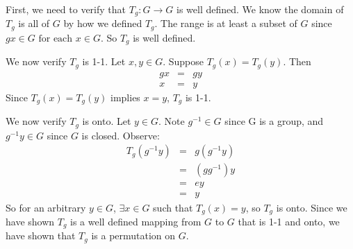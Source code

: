 \documentclass{article}
\begin{document}
First, we need to verify that $T_g \colon G \to G$ is well defined. We know the domain of $T_g$ is all of $G$ by how we defined $T_g$. The range is at least a subset of $G$ since $gx \in G \mbox{ for each }x \in G$. So $T_g$ is well defined.

We now verify $T_g$ is 1-1. Let $x,y \in G$. Suppose $T_g(x)=T_g(y)$. Then
\begin{eqnarray*}
 gx &=& gy \\
 x &=& y
\end{eqnarray*}
Since $T_g(x)=T_g(y)$ implies $x=y$, $T_g$ is 1-1.

We now verify $T_g$ is onto. Let $y \in G$. Note $g^{-1} \in G$ since G is a group, and $g^{-1}y \in G$ since $G$ is closed. Observe:
\begin{eqnarray*}
T_g(g^{-1}y)&=&g(g^{-1}y) \\
&=& (gg^{-1})y \\
&=& ey \\
&=& y
\end{eqnarray*}
So for an arbitrary $y \in G$, $\exists x \in G$ such that $T_g(x)=y$, so $T_g$ is onto. Since we have shown $T_g$ is a well defined mapping from $G$ to $G$ that is 1-1 and onto, we have shown that $T_g$ is a permutation on $G$.
\end{document}
